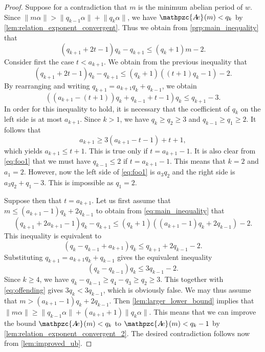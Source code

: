 \documentclass[a4paper,fleqn]{article}
\providecommand{\norm}[1]{\lVert#1\rVert}
\newcommand{\abexp}[2][]{\mathpzc{A\mkern-3mu e}_{#1}(#2)}
\begin{document}
  \begin{proof}
    Suppose for a contradiction that $m$ is the minimum abelian period of $w$. Since
    $\norm{m\alpha} > \norm{q_{k-1}\alpha} + \norm{q_k\alpha}$, we have $\abexp{m} < q_k$ by
    \autoref{lem:relation_exponent_convergent}. Thus we obtain from \autoref{prp:main_inequality} that
    \begin{equation*}
      (q_{k+1} + 2t - 1)q_k - q_{k+1} \leq (q_k + 1)m - 2.
    \end{equation*}
    Consider first the case $t < a_{k+1}$. We obtain from the previous inequality that
    \begin{equation*}
      (q_{k+1} + 2t - 1)q_k - q_{k+1} \leq (q_k + 1)((t + 1)q_k - 1) - 2.
    \end{equation*}
    By rearranging and writing $q_{k+1} = a_{k+1}q_k + q_{k-1}$, we obtain
    \begin{equation}\label{eq:foo1}
      ((a_{k+1} - (t + 1))q_k + q_{k-1} + t - 1)q_k \leq q_{k+1} - 3.
    \end{equation}
    In order for this inequality to hold, it is necessary that the coefficient of $q_k$ on the left side is at most
    $a_{k+1}$. Since $k > 1$, we have $q_k \geq q_2 \geq 3$ and $q_{k-1} \geq q_1 \geq 2$. It follows that
    \begin{equation*}
      a_{k+1} \geq 3(a_{k+1} - t - 1) + t + 1,
    \end{equation*}
    which yields $a_{k+1} \leq t + 1$. This is true only if $t = a_{k+1} - 1$. It is also clear from \eqref{eq:foo1}
    that we must have $q_{k-1} \leq 2$ if $t = a_{k+1} - 1$. This means that $k = 2$ and $a_1 = 2$. However, now the
    left side of \eqref{eq:foo1} is $a_3 q_2$ and the right side is $a_3 q_2 + q_1 - 3$. This is impossible as
    $q_1 = 2$.

    Suppose then that $t = a_{k+1}$. Let us first assume that $m \leq (a_{k+1}-1)q_k + 2q_{k-1}$ to obtain from
    \eqref{eq:main_inequality} that
    \begin{equation*}
      (q_{k+1} + 2a_{k+1} - 1)q_k - q_{k+1} \leq (q_k + 1)((a_{k+1}-1)q_k + 2q_{k-1}) - 2.
    \end{equation*}
    This inequality is equivalent to
    \begin{equation*}
      (q_k - q_{k-1} + a_{k+1})q_k \leq q_{k+1} + 2q_{k-1} - 2.
    \end{equation*}
    Substituting $q_{k+1} = a_{k+1}q_k + q_{k-1}$ gives the equivalent inequality
    \begin{equation}\label{eq:offending}
      (q_k - q_{k-1})q_k \leq 3q_{k-1} - 2.
    \end{equation}
    Since $k \geq 4$, we have $q_k - q_{k-1} \geq q_4 - q_3 \geq q_2 \geq 3$. This together with \eqref{eq:offending}
    gives $3q_k < 3q_{k-1}$, which is obviously false. We may thus assume that $m > (a_{k+1}-1)q_k + 2q_{k-1}$. Then
    \autoref{lem:larger_lower_bound} implies that
    $\norm{m\alpha} \geq \norm{q_{k-1}\alpha} + (a_{k+1} + 1)\norm{q_k\alpha}$. This means that we can improve the bound
    $\abexp{m} < q_k$ to $\abexp{m} < q_k - 1$ by \autoref{lem:relation_exponent_convergent_2}. The desired
    contradiction follows now from \autoref{lem:improved_ub}.
  \end{proof}
\end{document}
